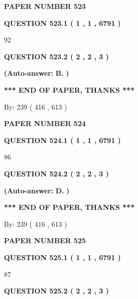 \documentclass{ctexart}
\begin{document}
   
\newpage 
\setcounter{page}{ 
   523001 } 
   
   
 {\textbf{ \Large{ PAPER NUMBER  523  }}}
   
   
   
   
  
  
{\textbf{\large{QUESTION
523.1 
 ( 1 , 1 , 6791 )
}}}

92
  
  
{\textbf{\large{QUESTION
523.2 
 ( 2 , 2 , 3 )
}}}
 
 
{\textbf{(Auto-answer:}}
{\textbf{\large{
B.}}}
{\textbf{)}}
 
 
   
   
   
   
\vspace{1.0in} 
{\textbf{\large{ *** END OF PAPER, THANKS *** }}} 
   
   
\hspace{1.0in} By: 
 239 ( 416 ,  613 )
   
   
   
   
\newpage 
\setcounter{page}{ 
   524001 } 
   
   
 {\textbf{ \Large{ PAPER NUMBER  524  }}}
   
   
   
   
  
  
{\textbf{\large{QUESTION
524.1 
 ( 1 , 1 , 6791 )
}}}

86
  
  
{\textbf{\large{QUESTION
524.2 
 ( 2 , 2 , 3 )
}}}
 
 
{\textbf{(Auto-answer:}}
{\textbf{\large{
D.}}}
{\textbf{)}}
 
 
   
   
   
   
\vspace{1.0in} 
{\textbf{\large{ *** END OF PAPER, THANKS *** }}} 
   
   
\hspace{1.0in} By: 
 239 ( 416 ,  613 )
   
   
   
   
\newpage 
\setcounter{page}{ 
   525001 } 
   
   
 {\textbf{ \Large{ PAPER NUMBER  525  }}}
   
   
   
   
  
  
{\textbf{\large{QUESTION
525.1 
 ( 1 , 1 , 6791 )
}}}

87
  
  
{\textbf{\large{QUESTION
525.2 
 ( 2 , 2 , 3 )
}}}
 
\end{document}
